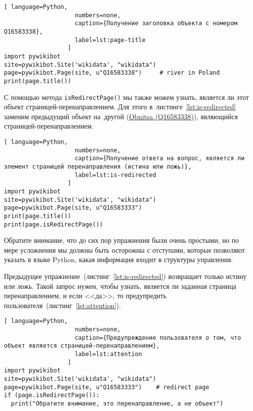 \begin{lstlisting}[ language=Python,
                    numbers=none,
                    caption={Получение заголовка объекта с номером Q16583338},
                    label=lst:page-title
                  ]
import pywikibot
site=pywikibot.Site('wikidata', "wikidata")
page=pywikibot.Page(site, u"Q16583338")     # river in Poland
print(page.title())
\end{lstlisting}

С помощью метода \lstinline|isRedirectPage()| 
мы также можем узнать, является ли этот объект страницей-перенаправлением. 
Для этого в~листинге~\ref{lst:is-redirected} 
заменим предыдущий объект на~другой 
(\href{https://www.wikidata.org/w/index.php?title=Q16583333&redirect=no}{Obnitsa (Q16583338)}), 
являющийся страницей-перенаправлением.

\begin{lstlisting}[ language=Python,
                    numbers=none,
                    caption={Получение ответа на вопрос, является ли элемент страницей перенаправления (истина или ложь)},
                    label=lst:is-redirected
                  ]
import pywikibot
site=pywikibot.Site('wikidata', "wikidata")
page=pywikibot.Page(site, u"Q16583333")
print(page.title())
print(page.isRedirectPage())
\end{lstlisting}

Обратите внимание, что до сих пор упражнения были очень простыми, но по мере усложнения мы должны быть осторожны с отступами, которые позволяют указать в языке Python, какая информация входит в структуры управления.

Предыдущее упражнение~(листинг~\ref{lst:is-redirected}) возвращает только истину или ложь. 
Такой запрос нужен, чтобы узнать, является ли заданная страница перенаправлением, 
и если <<да>>, 
то предупредить пользователя~(листинг~\ref{lst:attention}).



\newpage
\begin{lstlisting}[ language=Python,
                    numbers=none,
                    caption={Предупреждение пользователя о том, что объект является страницей-перенаправлением},
                    label=lst:attention
                  ]
import pywikibot
site=pywikibot.Site('wikidata', "wikidata")
page=pywikibot.Page(site, u"Q16583333")    # redirect page
if (page.isRedirectPage()):
  print("Обратите внимание, это перенаправление, а не объект")
\end{lstlisting}

